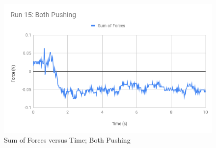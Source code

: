 \begin{figure}[ht]
    \centering
    \includegraphics[scale=0.71]{image/05-third-law/Run-15-Both-Pushing.png}
    \caption{Sum of Forces versus Time; Both Pushing}
    \label{figure:05.sf.B}
\end{figure}

